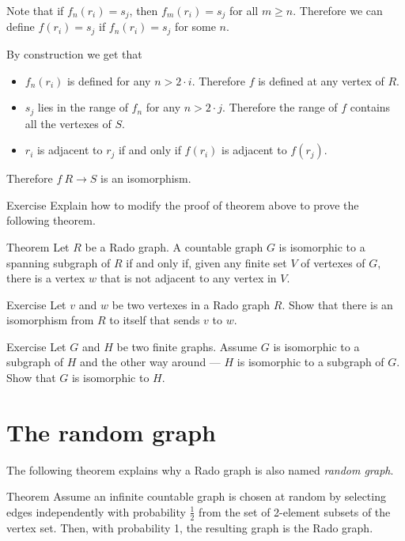 Note that if $f_n(r_i)=s_j$, then $f_m(r_i)=s_j$ for all $m\ge n$.
Therefore we can define $f(r_i)=s_j$ if $f_n(r_i)=s_j$ for some $n$.


By construction we get that 
\begin{itemize}
\item $f_n(r_i)$ is defined for any $n>2\cdot i$. Therefore $f$ is defined at any vertex of $R$.
\item $s_j$ lies in the range of $f_n$ for any $n>2\cdot j$.
Therefore the range of $f$ contains all the vertexes of $S$.
\item $r_i$ is adjacent to $r_j$ if and only if $f(r_i)$ is adjacent to $f(r_j)$.
\end{itemize}
Therefore $f\:R\to S$ is an isomorphism.
\qeds

\begin{thm}{Exercise}
Explain how to modify the proof of theorem above to prove the following theorem.
\end{thm}


\begin{thm}{Theorem}
Let $R$ be a Rado graph.
A countable graph $G$ is isomorphic to a spanning subgraph of $R$ if and only if, given any finite set $V$ of vertexes of $G$, there is a vertex $w$ that is not adjacent to any vertex in $V$.
\end{thm}

\begin{thm}{Exercise}
Let $v$ and $w$ be two vertexes in a Rado graph $R$.
Show that there is an isomorphism from $R$ to itself that sends $v$ to $w$.
\end{thm}

\begin{thm}{Exercise}\label{ex:finite-subgraphs}
Let $G$ and $H$ be two finite graphs.
Assume $G$ is isomorphic to a subgraph of $H$ 
and the other way around --- $H$ is isomorphic to a subgraph of $G$.
Show that $G$ is isomorphic to $H$.
\end{thm}


\section*{The random graph}

The following theorem explains why a Rado graph is also named {}\emph{random graph}.

\begin{thm}{Theorem}\label{thm:the-random-graph}
Assume an infinite countable graph is chosen at random by selecting edges independently with probability $\tfrac12$ from the set of 2-element subsets of the vertex set.
Then, with probability 1, the resulting graph is the Rado graph.
\end{thm}

